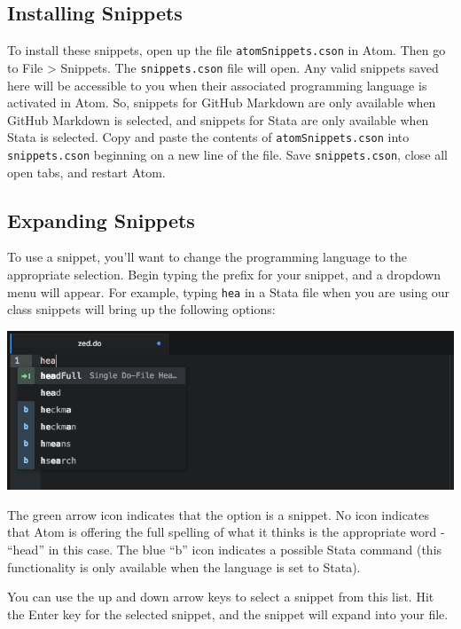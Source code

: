 \documentclass[]{book}
\theoremstyle{definition}
\theoremstyle{definition}
\theoremstyle{remark}
\begin{document}
\subsection{Installing Snippets}\label{installing-snippets}

To install these snippets, open up the file \texttt{atomSnippets.cson}
in Atom. Then go to File \textgreater{} Snippets. The
\texttt{snippets.cson} file will open. Any valid snippets saved here
will be accessible to you when their associated programming language is
activated in Atom. So, snippets for GitHub Markdown are only available
when GitHub Markdown is selected, and snippets for Stata are only
available when Stata is selected. Copy and paste the contents of
\texttt{atomSnippets.cson} into \texttt{snippets.cson} beginning on a
new line of the file. Save \texttt{snippets.cson}, close all open tabs,
and restart Atom.

\subsection{Expanding Snippets}\label{expanding-snippets}

To use a snippet, you'll want to change the programming language to the
appropriate selection. Begin typing the prefix for your snippet, and a
dropdown menu will appear. For example, typing \texttt{hea} in a Stata
file when you are using our class snippets will bring up the following
options:

\includegraphics[width=1\linewidth]{images/atomSnippet}

The green arrow icon indicates that the option is a snippet. No icon
indicates that Atom is offering the full spelling of what it thinks is
the appropriate word - ``head'' in this case. The blue ``b'' icon
indicates a possible Stata command (this functionality is only available
when the language is set to Stata).

You can use the up and down arrow keys to select a snippet from this
list. Hit the Enter key for the selected snippet, and the snippet will
expand into your file.
\end{document}
